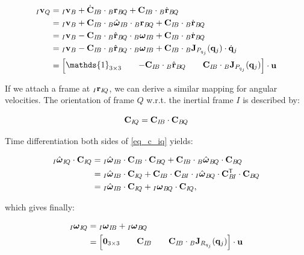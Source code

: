 \documentclass[10pt,landscape,a4paper]{article}
\newcommand\identity{\mathds{1}}
\newcommand\transpose{\mathsf{T}}
\newcommand\pos[3]{{}_#1\vr_{#2\!#3}}
\newcommand\posdot[3]{{}_#1\dot{\vr}_{#2\!#3}}
\newcommand\poshat[3]{{}_#1\hat{\vr}_{#2\!#3}}
\newcommand\comat[2]{\vC_{#1\!#2}}
\newcommand\dcomat[2]{\dot{\vC}_{#1\!#2}}
\newcommand\rotvel[3]{{}_#1\vom_{#2\!#3}}
\newcommand\rotvelhat[3]{{}_#1\hat{\vom}_{#2\!#3}}
\begin{document}
\begin{multicols}{2}
\begin{equation}
\begin{aligned}
{}_I \vv_{Q} 
&= {}_I \vv_{B} + \dcomat{I}{B} \cdot \pos{B}{B}{Q} + \comat{I}{B} \cdot \posdot{B}{B}{Q} \\
&= {}_I \vv_{B} + \comat{I}{B} \cdot \rotvelhat{B}{I}{B} \cdot \pos{B}{B}{Q} + \comat{I}{B} \cdot \posdot{B}{B}{Q} \\
&= {}_I \vv_{B} - \comat{I}{B} \cdot \poshat{B}{B}{Q} \cdot \rotvel{B}{I}{B} + \comat{I}{B} \cdot \posdot{B}{B}{Q} \\
&= {}_I \vv_{B} - \comat{I}{B} \cdot \poshat{B}{B}{Q} \cdot \rotvel{B}{I}{B} + \comat{I}{B} \cdot {}_B \vJ_{P_{q_j}}(\vq_j) \cdot \dot{\vq}_j \\
&=
\begin{bmatrix}
\identity_{3\times 3} && -\comat{I}{B} \cdot \poshat{B}{B}{Q} && \comat{I}{B} \cdot {}_B \vJ_{P_{q_j}}(\vq_j)
\end{bmatrix}
\cdot \vu
\end{aligned}
\end{equation}

If we attach a frame at $\pos{I}{I}{Q}$, we can derive a similar mapping for angular velocities. The orientation of frame $Q$ w.r.t. the inertial frame $I$ is described by:

\begin{equation}\label{eq_c_iq}
\comat{I}{Q} = \comat{I}{B} \cdot \comat{B}{Q}
\end{equation}

Time differentiation both sides of \eqref{eq_c_iq} yields:

\begin{equation}
\begin{aligned}
\rotvelhat{I}{I}{Q} \cdot \comat{I}{Q}
&= \rotvelhat{I}{I}{B} \cdot \comat{I}{B} \cdot \comat{B}{Q} + \comat{I}{B} \cdot \rotvelhat{B}{B}{Q} \cdot \comat{B}{Q} \\
&= \rotvelhat{I}{I}{B} \cdot \comat{I}{Q} + \comat{I}{B} \cdot \comat{B}{I} \cdot \rotvelhat{I}{B}{Q} \cdot \comat{B}{I}^\transpose \cdot \comat{B}{Q} \\
&= \rotvelhat{I}{I}{B} \cdot \comat{I}{Q} + \rotvel{I}{B}{Q} \cdot \comat{I}{Q},
\end{aligned}
\end{equation}

which gives finally:

\begin{equation}
\begin{aligned}
\rotvel{I}{I}{Q}
&= \rotvel{I}{I}{B} + \rotvel{I}{B}{Q} \\
&= 
\begin{bmatrix}
\mathbf{0}_{3 \times 3} && \comat{I}{B} && \comat{I}{B} \cdot {}_B \vJ_{R_{q_j}}(\vq_j)
\end{bmatrix}
\cdot \vu
\end{aligned}
\end{equation}


\end{multicols}
\end{document}

